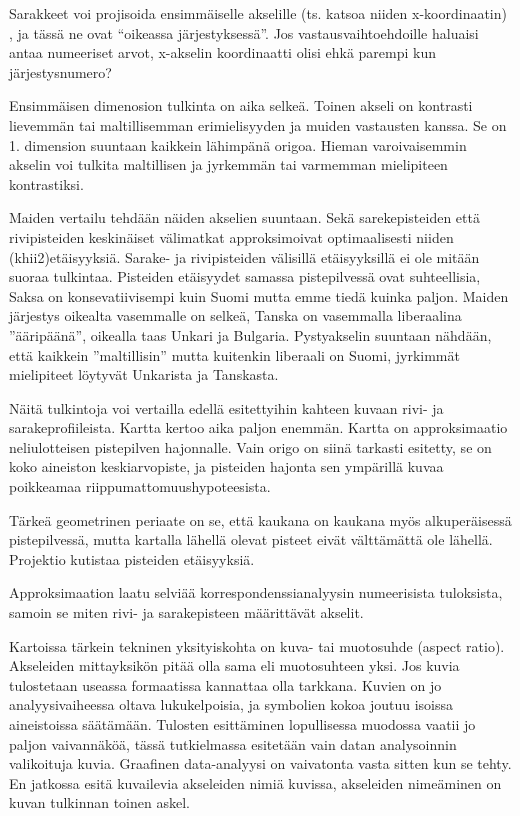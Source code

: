 \documentclass[
  finnish,
]{book}
\begin{document}
Sarakkeet voi projisoida ensimmäiselle akselille (ts. katsoa niiden x-koordinaatin)
, ja tässä ne ovat ``oikeassa järjestyksessä''.
Jos vastausvaihtoehdoille haluaisi antaa numeeriset arvot, x-akselin koordinaatti
olisi ehkä parempi kun järjestysnumero?

Ensimmäisen dimenosion tulkinta on aika selkeä. Toinen akseli on kontrasti
lievemmän tai maltillisemman erimielisyyden ja muiden vastausten kanssa.
Se on 1. dimension suuntaan kaikkein lähimpänä origoa. Hieman varoivaisemmin
akselin voi tulkita maltillisen ja jyrkemmän tai varmemman mielipiteen kontrastiksi.

Maiden vertailu tehdään näiden akselien suuntaan. Sekä sarekepisteiden että
rivipisteiden keskinäiset välimatkat approksimoivat optimaalisesti niiden
(khii2)etäisyyksiä. Sarake- ja rivipisteiden välisillä etäisyyksillä ei ole
mitään suoraa tulkintaa. Pisteiden etäisyydet samassa pistepilvessä ovat
suhteellisia, Saksa on konsevatiivisempi kuin Suomi mutta emme tiedä kuinka paljon.
Maiden järjestys oikealta vasemmalle on selkeä, Tanska on vasemmalla
liberaalina ''ääripäänä'', oikealla taas Unkari ja Bulgaria. Pystyakselin suuntaan
nähdään, että kaikkein ''maltillisin'' mutta kuitenkin liberaali on Suomi,
jyrkimmät mielipiteet löytyvät Unkarista ja Tanskasta.

Näitä tulkintoja voi vertailla edellä esitettyihin kahteen kuvaan rivi- ja
sarakeprofiileista. Kartta kertoo aika paljon enemmän.
Kartta on approksimaatio neliulotteisen pistepilven hajonnalle. Vain origo on
siinä tarkasti esitetty, se on koko aineiston keskiarvopiste, ja pisteiden
hajonta sen ympärillä kuvaa poikkeamaa riippumattomuushypoteesista.

Tärkeä geometrinen periaate on se, että kaukana on kaukana myös alkuperäisessä
pistepilvessä, mutta kartalla lähellä olevat pisteet eivät välttämättä ole lähellä.
Projektio kutistaa pisteiden etäisyyksiä.

Approksimaation laatu selviää korrespondenssianalyysin numeerisista tuloksista,
samoin se miten rivi- ja sarakepisteen määrittävät akselit.

Kartoissa tärkein tekninen yksityiskohta on kuva- tai muotosuhde (aspect ratio).
Akseleiden mittayksikön pitää olla sama eli muotosuhteen yksi. Jos kuvia
tulostetaan useassa formaatissa kannattaa olla tarkkana. Kuvien on jo
analyysivaiheessa oltava lukukelpoisia, ja symbolien kokoa joutuu isoissa
aineistoissa säätämään. Tulosten esittäminen lopullisessa muodossa vaatii jo
paljon vaivannäköä, tässä tutkielmassa esitetään vain datan analysoinnin
valikoituja kuvia. Graafinen data-analyysi on vaivatonta vasta sitten kun se tehty.
En jatkossa esitä kuvailevia akseleiden nimiä kuvissa,
akseleiden nimeäminen on kuvan tulkinnan toinen askel.
\end{document}
